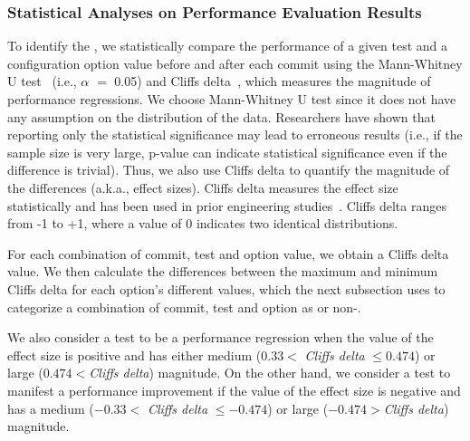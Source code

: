 \subsubsection{Statistical Analyses on Performance Evaluation Results}
\label{sec:statisticalAnalysis}

To identify the \inconsistent, we statistically compare the performance of a given test and a configuration option value before and after each commit using the %
Mann-Whitney U test~\cite{nachar2008mann} %
(i.e., $\alpha$ $=$ 0.05) and Cliff\textquotesingle s delta~\cite{ES2006:Becker}, which measures the magnitude of performance regressions. We choose Mann-Whitney U test since it does not have any assumption on the distribution of the data. Researchers have shown that reporting only the statistical significance may lead to erroneous results (i.e., if the sample size is very large, p-value can indicate statistical significance even if the difference is trivial). Thus, we also use Cliff\textquotesingle s delta to quantify the magnitude of the differences (a.k.a., effect sizes). Cliff\textquotesingle s delta measures the effect size statistically and has been used in prior engineering studies~\cite{ICSE2002:Kitchenham, Liao2020LogPerfReg, DBLP:journals/ese/LiCSH18}. Cliff\textquotesingle s delta ranges from -1 to +1, where a value of 0 indicates two identical distributions.

For each combination of commit, test and option value, we obtain a Cliff\textquotesingle s delta value. We then calculate the differences between the maximum and minimum Cliff\textquotesingle s delta for each option's different values, which the next subsection uses to categorize a combination of commit, test and option as \inconsistent or non-\inconsistent.%

We also consider a test to be a performance regression when the value of the effect size is positive and has either medium ($0.33 <$ \emph{Cliff\textquotesingle s delta} $\leqslant 0.474$) or large ($0.474 < $\emph{Cliff\textquotesingle s delta}) magnitude. On the other hand, we consider a test to manifest a performance improvement if the value of the effect size is negative and has a medium ($-0.33 <$ \emph{Cliff\textquotesingle s delta} $\leqslant -0.474$) or large ($-0.474 > $\emph{Cliff\textquotesingle s delta}) magnitude. 

